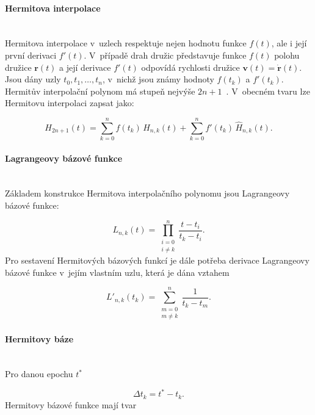 \paragraph{Hermitova interpolace}\leavevmode\\
Hermitova interpolace v~uzlech respektuje nejen hodnotu funkce $f(t)$, ale i její první derivaci $f'(t)$. V~případě drah družic představuje funkce $f(t)$ polohu družice $\mathbf r(t)$ a její derivace $f'(t)$ odpovídá rychlosti družice $\mathbf v(t)=\dot{\mathbf r}(t)$. Jsou dány uzly \(t_0, t_1, \dots, t_n\), v~nichž jsou známy hodnoty $f(t_k)$ a $f'(t_k)$. Hermitův interpolační polynom má stupeň nejvýše $2n+1$~\cite{zeitlhoefler_2024_interpolation}. V~obecném tvaru lze Hermitovu interpolaci zapsat jako:

\begin{equation}
H_{2n+1}(t) = \sum_{k=0}^{n} f(t_k)\,H_{n,k}(t) + \sum_{k=0}^{n} f'(t_k)\,\hat H_{n,k}(t).
\label{eq:hermite_general}
\end{equation}

\paragraph{Lagrangeovy bázové funkce}\leavevmode\\
Základem konstrukce Hermitova interpolačního polynomu jsou Lagrangeovy bázové funkce:

\begin{equation}
L_{n,k}(t)=
\prod_{\substack{i=0 \\ i\neq k}}^{n}
\frac{t-t_i}{t_k-t_i}.
\label{eq:lagrange_basis}
\end{equation}
Pro sestavení Hermitových bázových funkcí je dále potřeba derivace Lagrangeovy bázové funkce v~jejím vlastním uzlu, která je dána vztahem

\begin{equation}
L'_{n,k}(t_k)=
\sum_{\substack{m=0 \\ m\neq k}}^{n}
\frac{1}{t_k-t_m}.
\label{eq:lagrange_deriv}
\end{equation}

\paragraph{Hermitovy báze}\leavevmode\\
Pro danou epochu $t^\ast$

\begin{equation}
\Delta t_k = t^\ast - t_k.
\end{equation}
Hermitovy bázové funkce mají tvar

